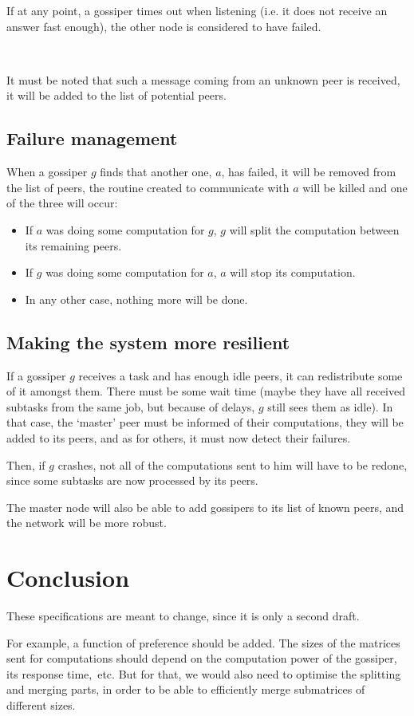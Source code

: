 \documentclass[a4paper,12pt]{article}
\begin{document}
    If at any point, a gossiper times out when listening (i.e. it does not receive an answer fast enough), the other node is considered to have failed.

~~

    It must be noted that such a message coming from an unknown peer is received, it will be added to the list of potential peers.

    \subsection{Failure management}
    When a gossiper $g$ finds that another one, $a$, has failed, it will be removed from the list of peers, the routine created to communicate with $a$ will be killed and one of the three will occur:

\begin{itemize}
\item If $a$ was doing some computation for $g$, $g$ will split the computation between its remaining peers.
\item If $g$ was doing some computation for $a$, $a$ will stop its computation.
\item In any other case, nothing more will be done. 
\end{itemize}

    \subsection{Making the system more resilient}
    If a gossiper $g$ receives a task and has enough idle peers, it can redistribute some of it amongst them. There must be some wait time (maybe they have all received subtasks from the same job, but because of delays, $g$ still sees them as idle).
In that case, the ‘master’ peer must be informed of their computations, they will be added to its peers, and as for others, it must now detect their failures.

    Then, if $g$ crashes, not all of the computations sent to him will have to be redone, since some subtasks are now processed by its peers.

    The master node will also be able to add gossipers to its list of known peers, and the network will be more robust.

    \section{Conclusion}
    These specifications are meant to change, since it is only a second draft.

    For example, a function of preference should be added. The sizes of the matrices sent for computations should depend on the computation power of the gossiper, its response time,~etc. But for that, we would also need to optimise the splitting and merging parts, in order to be able to efficiently merge submatrices of different sizes.
\end{document}
